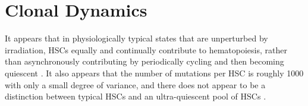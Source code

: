\documentclass[]{book}
\begin{document}
\hypertarget{clonal-dynamics}{%
\section{Clonal Dynamics}\label{clonal-dynamics}}

It appears that in physiologically typical states that are unperturbed by irradiation, HSCs equally and continually contribute to hematopoiesis, rather than asynchronously contributing by periodically cycling and then becoming quiescent \citep{lu2019clonal}. It also appears that the number of mutations per HSC is roughly 1000 with only a small degree of variance, and there does not appear to be a distinction between typical HSCs and an ultra-quiescent pool of HSCs \citep{lee2018population}.


\end{document}
